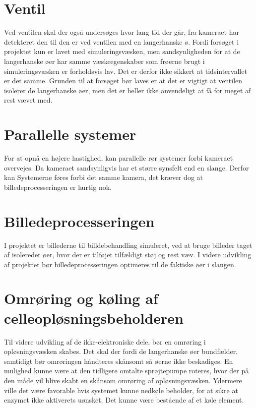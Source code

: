 \section{Ventil}
Ved ventilen skal der også undersøges hvor lang tid der går, fra kameraet har detekteret den til den er ved ventilen med en langerhanske ø. Fordi forsøget i projektet kun er lavet med simuleringsvæsken, men sandsynligheden for at de langerhanske øer har samme væskeegenskaber som frøerne brugt i simuleringsvæsken er forholdsvis lav. Det er derfor ikke sikkert at tidsintervallet er det samme. Grunden til at forsøget bør laves er at det er vigtigt at ventilen isolerer de langerhanske øer, men det er heller ikke anvendeligt at få for meget af rest vævet med.

\section{Parallelle systemer}
For at opnå en højere hastighed, kan parallelle rør systemer forbi kameraet overvejes.
Da kameraet sandsynligvis har et større synsfelt end en slange. Derfor kan Systemerne føres forbi det samme kamera, det kræver dog at billedeprocesseringen er hurtig nok.

\section{Billedeprocesseringen}
I projektet er billederne til billdebehandling simuleret, ved at bruge billeder taget af isoleredet øer, hvor der er tilføjet tilfældigt støj og rest væv. I videre udvikling af projektet bør billedeprocesseringen optimeres til de faktiske øer i slangen. 

\section{Omrøring og køling af celleopløsningsbeholderen}
Til videre udvikling af de ikke-elektroniske dele, bør en omrøring i opløsningsvæsken skabes. Det skal der fordi de langerhanske øer bundfælder, samtidigt bør omrøringen håndteres skånsomt så øerne ikke beskadiges. En mulighed kunne være at den tidligere omtalte sprøjtepumpe roteres, hvor der på den måde vil blive skabt en skånsom omrøring af opløsningsvæsken. Ydermere ville det være favorable hvis systemet kunne nedkøle beholder, for at sikre at enzymet ikke aktiverets uønsket. Det kunne være bestående af et køle element. 

